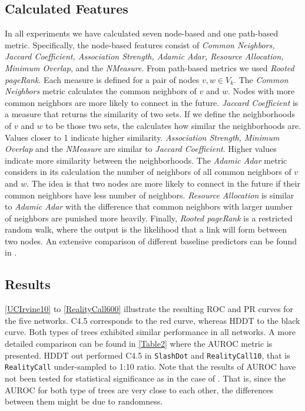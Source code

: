 \documentclass{acm_proc_article-sp}
\begin{document}
\subsection{Calculated Features}
In all experiments we have calculated seven node-based and one path-based metric. Specifically, the node-based features consist of \textit{Common Neighbors, Jaccard Coefficient, Association Strength, Adamic Adar, Resource Allocation, Minimum Overlap}, and the \textit{NMeasure}. From path-based metrics we used \textit{Rooted pageRank}. Each measure is defined for a pair of nodes ${v,w} \in V_k$. The \textit{Common Neighbors} metric calculates the common neighbors of $v$ and $w$. Nodes with more common neighbors are more likely to connect in the future. \textit{Jaccard Coefficient} is a measure that returns the similarity of two sets. If we define the neighborhoods of $v$ and $w$ to be those two sets, the  calculates how similar the neighborhoods are. Values closer to 1 indicate higher similarity. \textit{Association Strength, Minimum Overlap} and the \textit{NMeasure} are similar to \textit{Jaccard Coefficient}. Higher values indicate more similarity between the neighborhoods. The \textit{Adamic Adar} metric considers in its calculation the number of neighbors of all common neighbors of $v$ and $w$. The idea is that two nodes are more likely to connect in the future if their common neighbors have less number of neighbors. \textit{Resource Allocation} is similar to \textit{Adamic Adar} with the difference that common neighbors with larger number of neighbors are punished more heavily. Finally, \textit{Rooted pageRank} is a restricted random walk, where the output is the likelihood that a link will form between two nodes. An extensive comparison of different baseline predictors can be found in \cite{Liben-Nowell:2003:LPP:956863.956972}.

\subsection{Results}

\autoref{UCIrvine10} to \autoref{RealityCall600} illustrate the resulting ROC and PR curves for the five networks. C4.5 corresponds to the red curve, whereas HDDT to the black curve. Both types of trees exhibited similar performance in all networks. A more detailed comparison can be found in \autoref{Table2} where the AUROC metric is presented. HDDT out performed C4.5 in \texttt{SlashDot} and \texttt{RealityCall10}, that is \texttt{RealityCall} under-sampled to 1:10 ratio. Note that the results of AUROC have not been tested for statistical significance as in the case of \cite{Cieslak2012}. That is, since the AUROC for both type of trees are very close to each other, the differences between them might be due to randomness.
\end{document}
